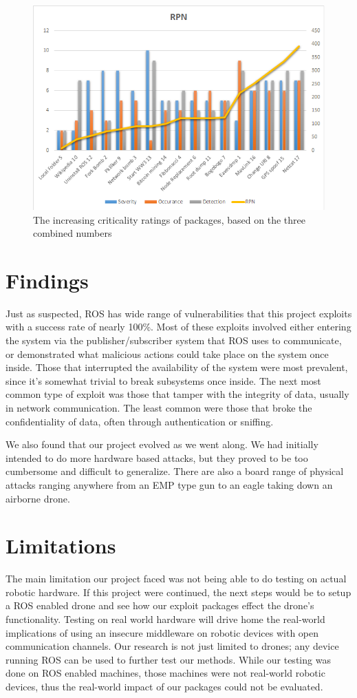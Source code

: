 \documentclass[IEEEtran,letterpaper,10pt,notitlepage,draftclsnofoot,onecolumn]{article}
\begin{document}
\begin{figure}[H]
    \centering
    \includegraphics[width=\textwidth]{RPN}
    \caption{The increasing criticality ratings of packages, based on the three combined numbers}
\end{figure}

\section{Findings}
Just as suspected, ROS has wide range of vulnerabilities that this project exploits with a success rate of nearly 100\%.
Most of these exploits involved either entering the system via the publisher/subscriber system that ROS uses to communicate, or demonstrated what malicious actions could take place on the system once inside.
Those that interrupted the availability of the system were most prevalent, since it's somewhat trivial to break subsystems once inside.
The next most common type of exploit was those that tamper with the integrity of data, usually in network communication.
The least common were those that broke the confidentiality of data, often through authentication or sniffing.

We also found that our project evolved as we went along.
We had initially intended to do more hardware based attacks, but they proved to be too cumbersome and difficult to generalize.
There are also a board range of physical attacks ranging anywhere from an EMP type gun to an eagle taking down an airborne drone.

\section{Limitations}
The main limitation our project faced was not being able to do testing on actual robotic hardware.
If this project were continued, the next steps would be to setup a ROS enabled drone and see how our exploit packages effect the drone's functionality.
Testing on real world hardware will drive home the real-world implications of using an insecure middleware on robotic devices with open communication channels.
Our research is not just limited to drones; any device running ROS can be used to further test our methods.
While our testing was done on ROS enabled machines, those machines were not real-world robotic devices, thus the real-world impact of our packages could not be evaluated.
\end{document}
